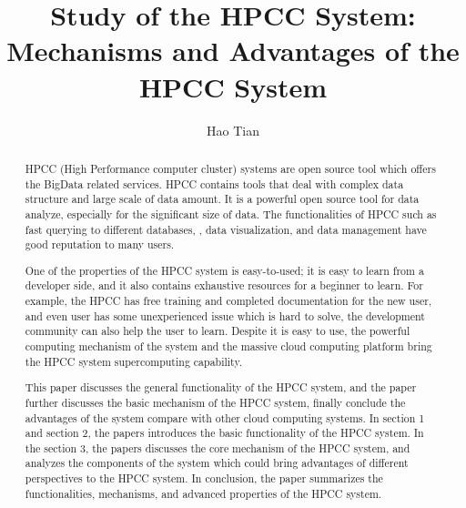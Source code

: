 
\title{Study of the HPCC System:
Mechanisms and Advantages of the HPCC System}

\author{Hao Tian}


\renewcommand{\shortauthors}{H. Tian.}


\begin{abstract}
HPCC (High Performance computer cluster) systems are open source tool which offers the BigData related services. HPCC contains tools that deal with complex data structure and large scale of data amount. It is a powerful open source tool for data analyze, especially for the significant size of data. The functionalities of HPCC such as fast querying to different databases, , data visualization, and data management have good reputation to many users.

One of the properties of the HPCC system is easy-to-used; it is easy to learn from a developer side, and it also contains exhaustive resources for a beginner to learn. For example, the HPCC has free training and completed documentation for the new user, and even user has some unexperienced issue which is hard to solve, the development community can also help the user to learn. Despite it is easy to use, the powerful computing mechanism of the system and the massive cloud computing platform bring the HPCC system supercomputing capability.

This paper discusses the general functionality of the HPCC system, and the paper further discusses the basic mechanism of the HPCC system, finally conclude the advantages of the system compare with other cloud computing systems. In section 1 and section 2, the papers introduces the basic functionality of the HPCC system. In the section 3, the papers discusses the core mechanism of the HPCC system, and analyzes the components of the system which could bring advantages of different perspectives to the HPCC system. In conclusion, the paper summarizes the functionalities, mechanisms, and advanced properties of the HPCC system.
\end{abstract}


\maketitle

